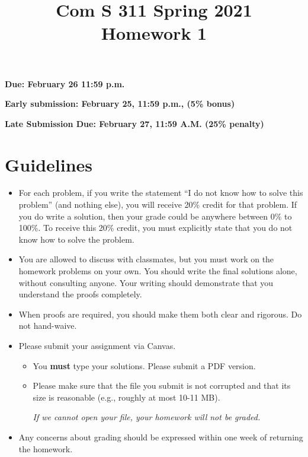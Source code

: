\documentclass[11pt]{amsart}
\begin{document}


\title{
Com S 311 Spring 2021\\
Homework 1
}

\maketitle


\vspace{-.8cm}
\begin{center}
{\bf Due:  February 26 11:59 p.m.}

\smallskip
\textbf{Early submission: February 25, 11:59 p.m., (5\% bonus)}

\smallskip
{\bf Late Submission Due: February 27, 11:59 \textbf{A.M.} (25\% penalty)}
\end{center}

\medskip

\section*{Guidelines}


\begin{itemize}

\item %
For each problem, if you write  the statement ``I do not know how to solve this problem'' (and nothing else), you will receive 20\% credit for that problem. If you do write a solution, then your grade could be anywhere between 0\% to 100\%.
To receive this 20\% credit, you must explicitly state that you do not know how to solve the problem.

\item You are allowed to discuss with classmates, but you must work on the homework problems on your own.  You should write the final solutions alone, without consulting anyone. Your writing should demonstrate that you understand the proofs completely.

\item When proofs are required, you should make them both clear and rigorous. Do not hand-waive.

 \item Please submit your assignment via Canvas.
 \begin{itemize}
\item  You \textbf{must} type your solutions. Please submit a PDF version.
\item Please make sure that the file you submit is not corrupted and that its size is reasonable (e.g., roughly at most 10-11 MB).
\begin{center}
\emph{If we cannot open your file, your homework will not be graded.}
\end{center}
\end{itemize}

\item Any concerns about grading should be expressed within one week of
returning the homework. 
 
\end{itemize}
\end{document}
